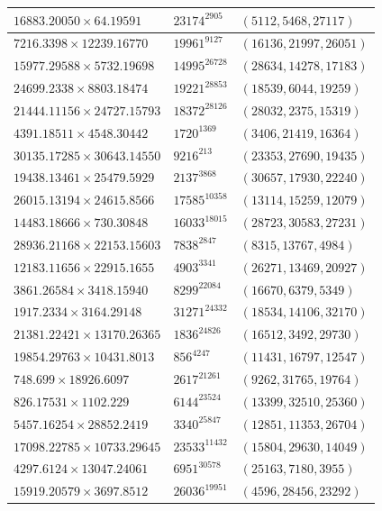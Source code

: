 \begin{longtable}{|l|l|l|}
  $16883.20050 \times 64.19591$ & $23174^{2905}$ & $(5112,5468,27117)$ \\ \hline
  $7216.3398 \times 12239.16770$ & $19961^{9127}$ & $(16136,21997,26051)$ \\ \hline
  $15977.29588 \times 5732.19698$ & $14995^{26728}$ & $(28634,14278,17183)$ \\ \hline
  $24699.2338 \times 8803.18474$ & $19221^{28853}$ & $(18539,6044,19259)$ \\ \hline
  $21444.11156 \times 24727.15793$ & $18372^{28126}$ & $(28032,2375,15319)$ \\ \hline
  $4391.18511 \times 4548.30442$ & $1720^{1369}$ & $(3406,21419,16364)$ \\ \hline
  $30135.17285 \times 30643.14550$ & $9216^{213}$ & $(23353,27690,19435)$ \\ \hline
  $19438.13461 \times 25479.5929$ & $2137^{3868}$ & $(30657,17930,22240)$ \\ \hline
  $26015.13194 \times 24615.8566$ & $17585^{10358}$ & $(13114,15259,12079)$ \\ \hline
  $14483.18666 \times 730.30848$ & $16033^{18015}$ & $(28723,30583,27231)$ \\ \hline
  $28936.21168 \times 22153.15603$ & $7838^{2847}$ & $(8315,13767,4984)$ \\ \hline$12183.11656 \times 22915.1655$ & $4903^{3341}$ & $(26271,13469,20927)$ \\ \hline
  $3861.26584 \times 3418.15940$ & $8299^{22084}$ & $(16670,6379,5349)$ \\ \hline
  $1917.2334 \times 3164.29148$ & $31271^{24332}$ & $(18534,14106,32170)$ \\ \hline
  $21381.22421 \times 13170.26365$ & $1836^{24826}$ & $(16512,3492,29730)$ \\ \hline
  $19854.29763 \times 10431.8013$ & $856^{4247}$ & $(11431,16797,12547)$ \\ \hline$748.699 \times 18926.6097$ & $2617^{21261}$ & $(9262,31765,19764)$ \\ \hline
  $826.17531 \times 1102.229$ & $6144^{23524}$ & $(13399,32510,25360)$ \\ \hline
  $5457.16254 \times 28852.2419$ & $3340^{25847}$ & $(12851,11353,26704)$ \\ \hline
  $17098.22785 \times 10733.29645$ & $23533^{11432}$ & $(15804,29630,14049)$ \\ \hline
  $4297.6124 \times 13047.24061$ & $6951^{30578}$ & $(25163,7180,3955)$ \\ \hline
  $15919.20579 \times 3697.8512$ & $26036^{19951}$ & $(4596,28456,23292)$ \\ \hline

\end{longtable}
